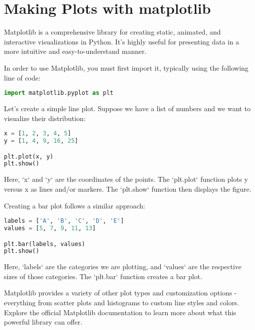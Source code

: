\chapter{Making Plots with matplotlib}

Matplotlib is a comprehensive library for creating static, animated, and interactive visualizations in Python. It's highly useful for presenting data in a more intuitive and easy-to-understand manner. 

In order to use Matplotlib, you must first import it, typically using the following line of code:

\begin{lstlisting}[language=Python]
import matplotlib.pyplot as plt
\end{lstlisting}

Let's create a simple line plot. Suppose we have a list of numbers and we want to visualize their distribution:

\begin{lstlisting}[language=Python]
x = [1, 2, 3, 4, 5]
y = [1, 4, 9, 16, 25]

plt.plot(x, y)
plt.show()
\end{lstlisting}

Here, `x` and `y` are the coordinates of the points. The `plt.plot` function plots y versus x as lines and/or markers. The `plt.show` function then displays the figure.

Creating a bar plot follows a similar approach:

\begin{lstlisting}[language=Python]
labels = ['A', 'B', 'C', 'D', 'E']
values = [5, 7, 9, 11, 13]

plt.bar(labels, values)
plt.show()
\end{lstlisting}

Here, `labels` are the categories we are plotting, and `values` are the respective sizes of those categories. The `plt.bar` function creates a bar plot.

Matplotlib provides a variety of other plot types and customization options - everything from scatter plots and histograms to custom line styles and colors. Explore the official Matplotlib documentation to learn more about what this powerful library can offer.

